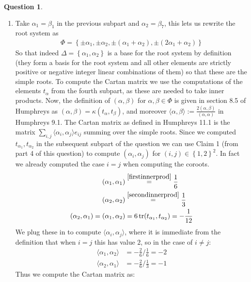 \documentclass[10.5pt]{article}
\theoremstyle{definition}
\newtheorem{pb}{Question}
\numberwithin{example}{subsection}
\numberwithin{proposition}{subsection}
\newcommand{\set}[1]{\left\{#1\right\}}
\newcommand{\gen}[1]{\langle#1\rangle}
\begin{document}
\begin{pb}
\begin{enumerate}
            \item Take \(\alpha_1 = \beta_1\) in the previous subpart and \(\alpha_2 = \beta_7\), this lets us rewrite the root system as
            \begin{align}
                \Phi = \set{\pm \alpha_1, \pm \alpha_2, \pm (\alpha_1 + \alpha_2), \pm (2 \alpha_1 + \alpha_2)}
            \end{align}
            So that indeed \(\Delta = \set{\alpha_1,\alpha_2}\) is a base for the root system by definition (they form a basis for the root system and all other elements are strictly positive or negative integer linear combinations of them) so that these are the simple roots.
            To compute the Cartan matrix we use the computations of the elements \(t_\alpha\) from the fourth subpart, as these are needed to take inner products. Now, the definition of \((\alpha,\beta)\) for \(\alpha,\beta \in \Phi\) is given in section 8.5 of Humphreys as \((\alpha,\beta) = \kappa(t_\alpha,t_\beta)\), and moreover \(\gen{\alpha,\beta} := \frac{2(\alpha,\beta)}{(\alpha,\alpha)}\) in Humphreys 9.1. The Cartan matrix as defined in Humphreys 11.1 is the matrix \(\sum_{i,j}\gen{\alpha_i,\alpha_j}e_{ij}\) summing over the simple roots. Since we computed \(t_{\alpha_1},t_{\alpha_2}\) in the subsequent subpart of the question we can use Claim 1 (from part 4 of this question) to compute \((\alpha_i,\alpha_j)\) for \((i,j) \in \set{1,2}^2\). In fact we already computed the case \(i = j\) when computing the coroots.
            \begin{align}
                (\alpha_1,\alpha_1) &\overset{\eqref{firstinnerprod}}{=} \frac{1}{6} \\
                (\alpha_2,\alpha_2) &\overset{\eqref{secondinnerprod}}{=} \frac13 \\
                (\alpha_2,\alpha_1) = (\alpha_1,\alpha_2) &= 6 \operatorname{tr}(t_{\alpha_1},t_{\alpha_2}) = -\frac{1}{12} \\
            \end{align}
            We plug these in to compute \(\gen{\alpha_i,\alpha_j}\), where it is immediate from the definition that when \(i = j\) this has value \(2\), so in the case of \(i \neq j\):
            \begin{align}
                \gen{\alpha_1,\alpha_2} &= -\frac26/\frac16 = -2 \\
                \gen{\alpha_2,\alpha_1} &= -\frac26/\frac13 = -1
            \end{align}
            Thus we compute the Cartan matrix as:

\end{enumerate}
\end{pb}
\end{document}
